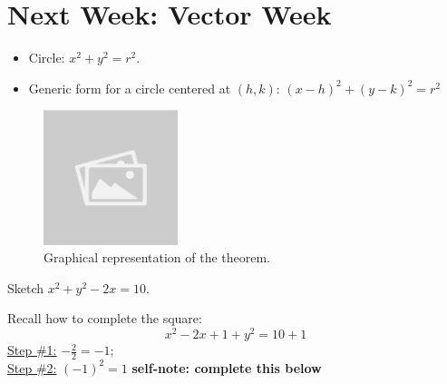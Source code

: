 \documentclass{article}
\begin{document}
\section*{Next Week: Vector Week}
\begin{theorembox}
\begin{itemize}
    \item Circle: \( x^2 + y^2 = r ^2 \).
    \item Generic form for a circle centered at \( (h, k) \): \( (x - h)^2 + (y - k)^2 = r^2 \)
\end{itemize}

\begin{figure}[H]
    \centering
    \includegraphics[width=0.35\textwidth]{sample_image1.jpg}
    \caption{Graphical representation of the theorem.}
    \label{fig:sample_image1}
\end{figure}

\end{theorembox}

\begin{examplebox}
Sketch \( x^2 + y^2 - 2x = 10 \).

\begin{solutionbox}
Recall how to complete the square:
\[
    x^2 - 2x + 1 + y^2 = 10 + 1
\]
\underline{Step \#1:} \( -\frac{2}{2} = -1 \); \\
\underline{Step \#2:} \( (-1)^2 = 1 \) 
\textbf{self-note: complete this below} 
\end{solutionbox}
\end{examplebox}
\end{document}
